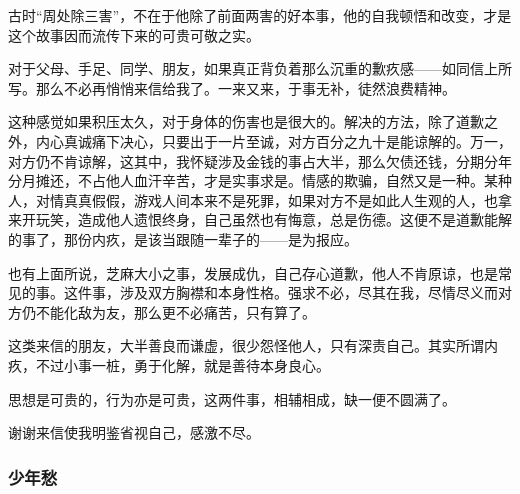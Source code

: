 \par 古时“周处除三害”，不在于他除了前面两害的好本事，他的自我顿悟和改变，才是这个故事因而流传下来的可贵可敬之实。
\par 对于父母、手足、同学、朋友，如果真正背负着那么沉重的歉疚感——如同信上所写。那么不必再悄悄来信给我了。一来又来，于事无补，徒然浪费精神。
\par 这种感觉如果积压太久，对于身体的伤害也是很大的。解决的方法，除了道歉之外，内心真诚痛下决心，只要出于一片至诚，对方百分之九十是能谅解的。万一，对方仍不肯谅解，这其中，我怀疑涉及金钱的事占大半，那么欠债还钱，分期分年分月摊还，不占他人血汗辛苦，才是实事求是。情感的欺骗，自然又是一种。某种人，对情真真假假，游戏人间本来不是死罪，如果对方不是如此人生观的人，也拿来开玩笑，造成他人遗恨终身，自己虽然也有悔意，总是伤德。这便不是道歉能解的事了，那份内疚，是该当跟随一辈子的——是为报应。
\par 也有上面所说，芝麻大小之事，发展成仇，自己存心道歉，他人不肯原谅，也是常见的事。这件事，涉及双方胸襟和本身性格。强求不必，尽其在我，尽情尽义而对方仍不能化敌为友，那么更不必痛苦，只有算了。
\par 这类来信的朋友，大半善良而谦虚，很少怨怪他人，只有深责自己。其实所谓内疚，不过小事一桩，勇于化解，就是善待本身良心。
\par 思想是可贵的，行为亦是可贵，这两件事，相辅相成，缺一便不圆满了。
\par 谢谢来信使我明鉴省视自己，感激不尽。
\par {}


\subsubsection{少年愁}


